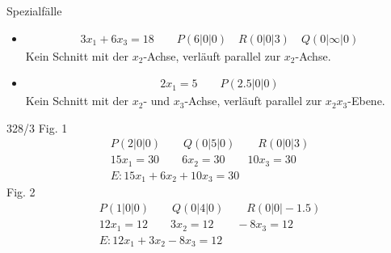 Spezialfälle
\begin{itemize}
  \item
  \begin{gather*}
    3x_1 + 6x_3 = 18 \qquad P(6|0|0) \quad R(0|0|3) \quad Q(0|\infty|0)
  \end{gather*}
  Kein Schnitt mit der $x_2$-Achse, verläuft parallel zur $x_2$-Achse.
  \item
  \begin{gather*}
    2x_1 = 5 \qquad P(2.5|0|0)
  \end{gather*}
  Kein Schnitt mit der $x_2$- und $x_3$-Achse, verläuft parallel zur $x_2x_3$-Ebene.
\end{itemize}
\begin{exercise}{328/3}
  Fig. 1
  \begin{gather*}
    P(2|0|0) \qquad Q(0|5|0) \qquad R(0|0|3) \\
    15x_1 = 30 \qquad 6x_2 = 30 \qquad 10x_3 = 30 \\
    E \colon 15x_1 + 6x_2 + 10x_3 = 30
  \end{gather*}
  Fig. 2
  \begin{gather*}
    P(1|0|0) \qquad Q(0|4|0) \qquad R(0|0|-1.5) \\
    12x_1 = 12 \qquad 3x_2 = 12 \qquad -8x_3 = 12 \\
    E \colon 12x_1 + 3x_2 - 8x_3 = 12
  \end{gather*}
\end{exercise}
